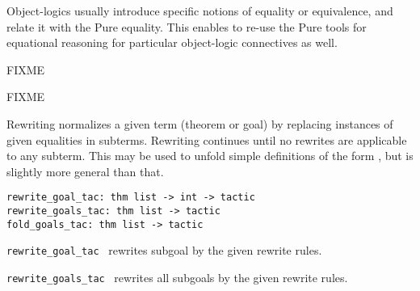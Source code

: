 \begin{isabellebody}
\begin{isamarkuptext}
  Object-logics usually introduce specific notions of equality or
  equivalence, and relate it with the Pure equality.  This enables to
  re-use the Pure tools for equational reasoning for particular
  object-logic connectives as well.%
\end{isamarkuptext}%
\isamarkuptrue%
%
\isamarkuptrue%
%
\begin{isamarkuptext}%
FIXME%
\end{isamarkuptext}%
\isamarkuptrue%
%
\isamarkuptrue%
%
\begin{isamarkuptext}%
FIXME%
\end{isamarkuptext}%
\isamarkuptrue%
%
\isamarkuptrue%
%
\begin{isamarkuptext}%
Rewriting normalizes a given term (theorem or goal) by
  replacing instances of given equalities  in subterms.
  Rewriting continues until no rewrites are applicable to any subterm.
  This may be used to unfold simple definitions of the form , but is slightly more general than that.%
\end{isamarkuptext}%
\isamarkuptrue%
%
\isadelimmlref
%
\endisadelimmlref
%
\isatagmlref
%
\begin{isamarkuptext}%
\begin{mldecls}
  \verb|rewrite_goal_tac: thm list -> int -> tactic| \\
  \verb|rewrite_goals_tac: thm list -> tactic| \\
  \verb|fold_goals_tac: thm list -> tactic| \\
  \end{mldecls}

  \begin{description}

  \item \verb|rewrite_goal_tac|~ rewrites subgoal
   by the given rewrite rules.

  \item \verb|rewrite_goals_tac|~ rewrites all subgoals
  by the given rewrite rules.


\end{description}
\end{isamarkuptext}
\end{isabellebody}
